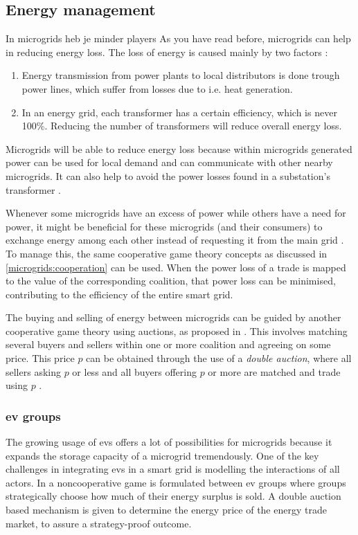 \subsection{Energy management}
In microgrids heb je minder players 
As you have read before, microgrids can help in reducing energy loss. The loss of energy is caused mainly by two factors \cite{EnergyLossURL}: 

\begin{enumerate}
\item Energy transmission from power plants to local distributors is done trough power lines, which suffer from losses due to i.e. heat generation\cite{LasseterPaigi2004}.
\item In an energy grid, each transformer has a certain efficiency, which is never 100\%. Reducing the number of transformers will reduce overall energy loss.
\end{enumerate}

Microgrids will be able to reduce energy loss because within microgrids generated power can be used for local demand and can communicate with other nearby microgrids. It can also help to avoid the power losses found in a substation's transformer \cite{keypaper}.

Whenever some microgrids have an excess of power while others have a need for power, it might be beneficial for these microgrids (and their consumers) to exchange energy among each other instead of requesting it from the main grid \cite{SaadHanPoorEtAl2011}. To manage this, the same cooperative game theory concepts as discussed in \ref{microgrids:cooperation} can be used. When the power loss of a trade is mapped to the value of the corresponding coalition, that power loss can be minimised, contributing to the efficiency of the entire smart grid. 

The buying and selling of energy between microgrids can be guided by another cooperative game theory using auctions, as proposed in \cite{SaadHanPoorEtAl2011}. This involves matching several buyers and sellers within one or more coalition and agreeing on some price. This price $p$ can be obtained through the use of a \emph{double auction}, where all sellers asking $p$ or less and all buyers offering $p$ or more are matched and trade using $p$ \cite{gjerstad1998price}.

\subsubsection{\ac{ev} groups}
The growing usage of \ac{ev}s offers a lot of possibilities for microgrids because it expands the storage capacity of a microgrid tremendously. One of the key challenges in integrating \ac{ev}s in a smart grid is modelling the interactions of all actors. In \cite{SaadHanPoorEtAl2011} a noncooperative game is formulated between \ac{ev} groups where groups strategically choose how much of their energy surplus is sold. A double auction based mechanism is given to determine the energy price of the energy trade market, to assure a strategy-proof outcome. 




